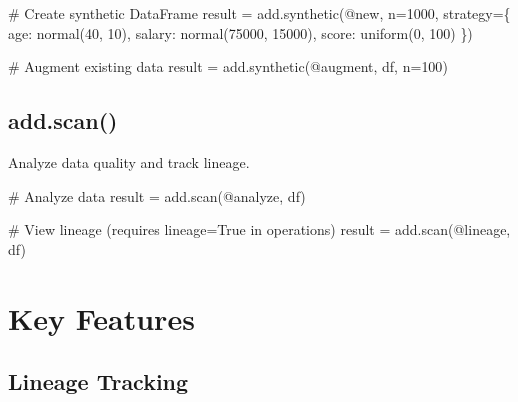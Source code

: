 \documentclass[
  letterpaper,
]{scrbook}
\newenvironment{Shaded}{\begin{snugshade}}{\end{snugshade}}
\newcommand{\CommentTok}[1]{\textcolor[rgb]{0.37,0.37,0.37}{#1}}
\newcommand{\DecValTok}[1]{\textcolor[rgb]{0.68,0.00,0.00}{#1}}
\newcommand{\NormalTok}[1]{\textcolor[rgb]{0.00,0.23,0.31}{#1}}
\newcommand{\OperatorTok}[1]{\textcolor[rgb]{0.37,0.37,0.37}{#1}}
\newcommand{\StringTok}[1]{\textcolor[rgb]{0.13,0.47,0.30}{#1}}
\begin{document}
\begin{Shaded}
\begin{Highlighting}[]
\CommentTok{\# Create synthetic DataFrame}
\NormalTok{result }\OperatorTok{=}\NormalTok{ add.synthetic(}\StringTok{\textquotesingle{}@new\textquotesingle{}}\NormalTok{, n}\OperatorTok{=}\DecValTok{1000}\NormalTok{, strategy}\OperatorTok{=}\NormalTok{\{}
    \StringTok{\textquotesingle{}age\textquotesingle{}}\NormalTok{: }\StringTok{\textquotesingle{}normal(40, 10)\textquotesingle{}}\NormalTok{,}
    \StringTok{\textquotesingle{}salary\textquotesingle{}}\NormalTok{: }\StringTok{\textquotesingle{}normal(75000, 15000)\textquotesingle{}}\NormalTok{,}
    \StringTok{\textquotesingle{}score\textquotesingle{}}\NormalTok{: }\StringTok{\textquotesingle{}uniform(0, 100)\textquotesingle{}}
\NormalTok{\})}

\CommentTok{\# Augment existing data}
\NormalTok{result }\OperatorTok{=}\NormalTok{ add.synthetic(}\StringTok{\textquotesingle{}@augment\textquotesingle{}}\NormalTok{, df, n}\OperatorTok{=}\DecValTok{100}\NormalTok{)}
\end{Highlighting}
\end{Shaded}

\subsection{add.scan()}\label{add.scan}

Analyze data quality and track lineage.

\begin{Shaded}
\begin{Highlighting}[]
\CommentTok{\# Analyze data}
\NormalTok{result }\OperatorTok{=}\NormalTok{ add.scan(}\StringTok{\textquotesingle{}@analyze\textquotesingle{}}\NormalTok{, df)}

\CommentTok{\# View lineage (requires lineage=True in operations)}
\NormalTok{result }\OperatorTok{=}\NormalTok{ add.scan(}\StringTok{\textquotesingle{}@lineage\textquotesingle{}}\NormalTok{, df)}
\end{Highlighting}
\end{Shaded}

\section{Key Features}\label{key-features-1}

\subsection{Lineage Tracking}\label{lineage-tracking}
\end{document}
